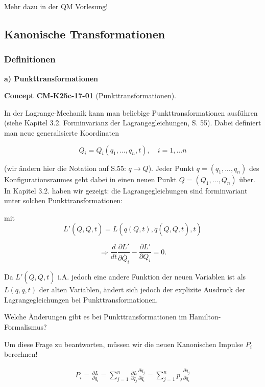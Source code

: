 \documentclass[10pt, letterpaper]{article}
\newcommand{\CustomHeading}[3]{%
  \par\medskip\noindent%
  \textbf{#1 #2} \textnormal{(#3)}.\enskip%
}
\newenvironment{CONC}[2]{\begin{unitbox}\CustomHeading{Concept}{#1}{#2}}{\end{unitbox}}
\begin{document}
Mehr dazu in der QM Vorlesung!



\pagebreak




\subsection{Kanonische Transformationen}


\subsubsection*{Definitionen}



\textbf{a) Punkttransformationen}

\begin{CONC}{CM-K25c-17-01}{Punkttransformationen}
In der Lagrange-Mechanik kann man beliebige Punkttransformationen ausführen (siehe Kapitel 3.2. Forminvarianz der Lagrangegleichungen, S. 55). Dabei definiert man neue generalisierte Koordinaten

\[Q_i = Q_i(q_1,...,q_n,t), \quad i=1,...n\]

(wir ändern hier die Notation auf S.55: $q \rightarrow Q$).
Jeder Punkt $q=(q_1,...,q_n)$ des Konfigurationsraumes geht dabei in einen neuen Punkt $Q=(Q_1,...,Q_n)$ über. In Kapitel 3.2. haben wir gezeigt: die Lagrangegleichungen sind forminvariant unter solchen Punkttransformationen:

mit \[L'(Q,\dot{Q},t) = L(q(Q,t),\dot{q}(Q,\dot{Q},t),t)\]

\[\Rightarrow \frac{d}{dt}\frac{\partial L'}{\partial \dot{Q_i}} - \frac{\partial L'}{\partial Q_i} = 0.\]

Da $L'(Q,\dot{Q},t)$ i.A. jedoch eine andere Funktion der neuen Variablen ist als $L(q,\dot{q},t)$ der alten Variablen, ändert sich jedoch der explizite Ausdruck der Lagrangegleichungen bei Punkttransformationen.

Welche Änderungen gibt es bei Punkttransformationen im Hamilton-Formalismus?

Um diese Frage zu beantworten, müssen wir die neuen Kanonischen Impulse $P_i$ berechnen!


\begin{align*}
P_i = \frac{\partial L}{\partial \dot{q}_i} = \sum_{j=1}^n \frac{\partial L}{\partial \dot{q}_j} \frac{\partial \dot{q}_j}{\partial \dot{q}_i} = \sum_{j=1}^n p_j \frac{\partial \dot{q}_j}{\partial \dot{q}_i}
\end{align*}


\end{CONC}
\end{document}
